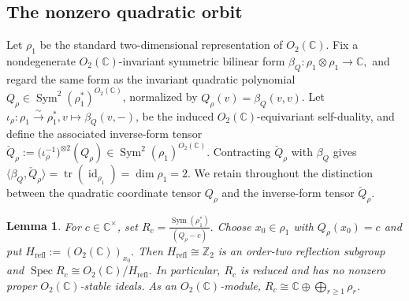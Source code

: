 \documentclass[12pt,leqno]{amsart}
\numberwithin{equation}{section} \newtheorem{thm}{Theorem}[section] \newtheorem{lem}[thm]{Lemma} \newtheorem{ex}[thm]{Example} \newtheorem{prop}[thm]{Proposition} \newtheorem{cor}[thm]{Corollary} \newtheorem{defi}[thm]{Definition} \newtheorem{rmk}[thm]{Remark} \newtheorem{notation}[thm]{Notation}
\newcommand{\id}{\operatorname{id}}
\newcommand{\Sym}{\operatorname{Sym}}
\newcommand{\Spec}{\operatorname{Spec}}
\newcommand{\Otwo}{O_2(\C)}
\def\Z{\mathbb{Z}} \def\N{\mathbb{N}} \def\A{\mathbb{A}} \def\C{\mathbb{C}} \def\R{\mathbb{R}} \def\Q{\mathbb{Q}} \def\F{\mathbb{F}}
\begin{document}
\subsection{The nonzero quadratic orbit}

Let $\rho_1$ be the standard two-dimensional representation of $\Otwo$. Fix a nondegenerate $\Otwo$-invariant symmetric bilinear form $ \beta_Q:\rho_1\otimes\rho_1\longrightarrow\C, $ and regard the same form as the invariant quadratic polynomial \(Q_\rho\in\Sym^2(\rho_1^*)^{\Otwo}\), normalized by \(Q_\rho(v)=\beta_Q(v,v)\). Let \(\iota_\rho:\rho_1\overset{\sim}{\longrightarrow}\rho_1^*, v\longmapsto\beta_Q(v,-)\), be the induced $\Otwo$-equivariant self-duality, and define the associated inverse-form tensor \(\check Q_\rho:= \bigl(\iota_\rho^{-1}\bigr)^{\otimes2}(Q_\rho) \in\Sym^2(\rho_1)^{\Otwo}\). Contracting $\check Q_\rho$ with $\beta_Q$ gives $ \langle\beta_Q,\check Q_\rho\rangle =\operatorname{tr}(\id_{\rho_1}) =\dim\rho_1=2. $ We retain throughout the distinction between the quadratic coordinate tensor $Q_\rho$ and the inverse-form tensor $\check Q_\rho$.

\begin{lem}\label{lem:O2-quadric}
For $c\in\C^\times$, set \(R_c=\frac{\Sym(\rho_1^*)}{(Q_\rho-c)}.\) Choose $x_0\in\rho_1$ with $Q_\rho(x_0)=c$ and put \(H_{\mathrm{refl}}:=(\Otwo)_{x_0}.\) Then $H_{\mathrm{refl}}\cong\Z_2$ is an order-two reflection subgroup and \(\Spec R_c\cong\Otwo/H_{\mathrm{refl}}.\) In particular, $R_c$ is reduced and has no nonzero proper $\Otwo$-stable ideals. As an $\Otwo$-module, \(R_c\cong\C\oplus\bigoplus_{r\ge1}\rho_r\).
\end{lem}
\end{document}
